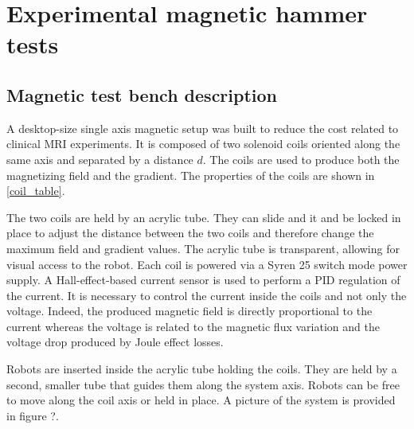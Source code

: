 \documentclass[letterpaper, 10 pt, conference]{ieeeconf}  %
\begin{document}
\section{Experimental magnetic hammer tests}

\subsection{Magnetic test bench description}

A desktop-size single axis magnetic setup was built to reduce the cost related to clinical MRI experiments. It is composed of two solenoid coils oriented along the same axis and separated by a distance $d$. The coils are used to produce both the magnetizing field and the gradient. The properties of the coils are shown in \cref{coil_table}.\par
The two coils are held by an acrylic tube. They can slide and it and be locked in place to adjust the distance between the two coils and therefore change the maximum field and gradient values. The acrylic tube is transparent, allowing for visual access to the robot.
Each coil is powered via a Syren 25 switch mode power supply. A Hall-effect-based current sensor is used to perform a PID regulation of the current. It is necessary to control the current inside the coils and not only the voltage. Indeed, the produced magnetic field is directly proportional to the current whereas the voltage is related to the magnetic flux variation and the voltage drop produced by Joule effect losses.\par
Robots are inserted inside the acrylic tube holding the coils. They are held by a second, smaller tube that guides them along the system axis. Robots can be free to move along the coil axis or held in place. A picture of the system is provided in figure ?.
\end{document}
